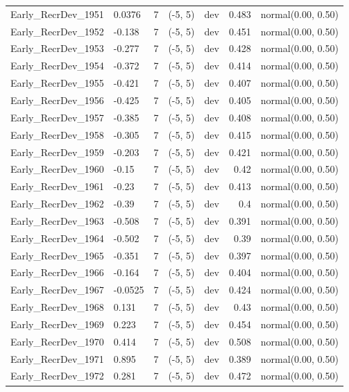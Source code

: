 \documentclass[
]{scrartcl}
\begin{document}
\begin{landscape}
\begin{longtable}{llrllrl}
Early\_RecrDev\_1951 & 0.0376 & 7 & (-5, 5) & dev & 0.483 & normal(0.00, 0.50) \\ 
Early\_RecrDev\_1952 & -0.138 & 7 & (-5, 5) & dev & 0.451 & normal(0.00, 0.50) \\ 
Early\_RecrDev\_1953 & -0.277 & 7 & (-5, 5) & dev & 0.428 & normal(0.00, 0.50) \\ 
Early\_RecrDev\_1954 & -0.372 & 7 & (-5, 5) & dev & 0.414 & normal(0.00, 0.50) \\ 
Early\_RecrDev\_1955 & -0.421 & 7 & (-5, 5) & dev & 0.407 & normal(0.00, 0.50) \\ 
Early\_RecrDev\_1956 & -0.425 & 7 & (-5, 5) & dev & 0.405 & normal(0.00, 0.50) \\ 
Early\_RecrDev\_1957 & -0.385 & 7 & (-5, 5) & dev & 0.408 & normal(0.00, 0.50) \\ 
Early\_RecrDev\_1958 & -0.305 & 7 & (-5, 5) & dev & 0.415 & normal(0.00, 0.50) \\ 
Early\_RecrDev\_1959 & -0.203 & 7 & (-5, 5) & dev & 0.421 & normal(0.00, 0.50) \\ 
Early\_RecrDev\_1960 & -0.15 & 7 & (-5, 5) & dev & 0.42 & normal(0.00, 0.50) \\ 
Early\_RecrDev\_1961 & -0.23 & 7 & (-5, 5) & dev & 0.413 & normal(0.00, 0.50) \\ 
Early\_RecrDev\_1962 & -0.39 & 7 & (-5, 5) & dev & 0.4 & normal(0.00, 0.50) \\ 
Early\_RecrDev\_1963 & -0.508 & 7 & (-5, 5) & dev & 0.391 & normal(0.00, 0.50) \\ 
Early\_RecrDev\_1964 & -0.502 & 7 & (-5, 5) & dev & 0.39 & normal(0.00, 0.50) \\ 
Early\_RecrDev\_1965 & -0.351 & 7 & (-5, 5) & dev & 0.397 & normal(0.00, 0.50) \\ 
Early\_RecrDev\_1966 & -0.164 & 7 & (-5, 5) & dev & 0.404 & normal(0.00, 0.50) \\ 
Early\_RecrDev\_1967 & -0.0525 & 7 & (-5, 5) & dev & 0.424 & normal(0.00, 0.50) \\ 
Early\_RecrDev\_1968 & 0.131 & 7 & (-5, 5) & dev & 0.43 & normal(0.00, 0.50) \\ 
Early\_RecrDev\_1969 & 0.223 & 7 & (-5, 5) & dev & 0.454 & normal(0.00, 0.50) \\ 
Early\_RecrDev\_1970 & 0.414 & 7 & (-5, 5) & dev & 0.508 & normal(0.00, 0.50) \\ 
Early\_RecrDev\_1971 & 0.895 & 7 & (-5, 5) & dev & 0.389 & normal(0.00, 0.50) \\ 
Early\_RecrDev\_1972 & 0.281 & 7 & (-5, 5) & dev & 0.472 & normal(0.00, 0.50) \\ 

\end{longtable}
\end{landscape}
\end{document}

